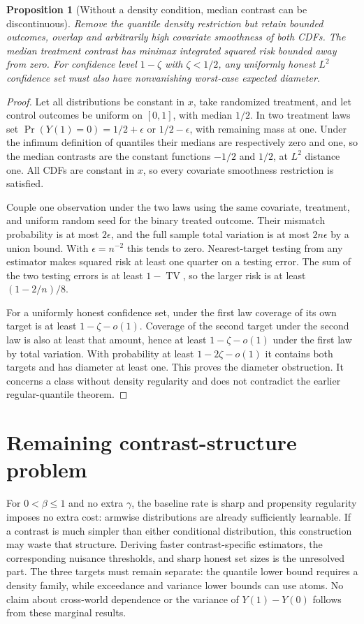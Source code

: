 \documentclass[11pt]{article}
\newtheorem{proposition}[theorem]{Proposition}
\theoremstyle{remark}
\newcommand{\TV}{\operatorname{TV}}
\begin{document}
\begin{proposition}[Without a density condition, median contrast can be discontinuous]\label{failure}
Remove the quantile density restriction but retain bounded outcomes, overlap and arbitrarily high covariate smoothness of both CDFs. The median treatment contrast has minimax integrated squared risk bounded away from zero. For confidence level $1-\zeta$ with $\zeta<1/2$, any uniformly honest $L^2$ confidence set must also have nonvanishing worst-case expected diameter.
\end{proposition}
\begin{proof}
Let all distributions be constant in $x$, take randomized treatment, and let control outcomes be uniform on $[0,1]$, with median $1/2$. In two treatment laws set
$\Pr(Y(1)=0)=1/2+\epsilon$ or $1/2-\epsilon$, with remaining mass at one. Under the infimum definition of quantiles their medians are respectively zero and one, so the median contrasts are the constant functions $-1/2$ and $1/2$, at $L^2$ distance one. All CDFs are constant in $x$, so every covariate smoothness restriction is satisfied.

Couple one observation under the two laws using the same covariate, treatment, and uniform random seed for the binary treated outcome. Their mismatch probability is at most $2\epsilon$, and the full sample total variation is at most $2n\epsilon$ by a union bound. With $\epsilon=n^{-2}$ this tends to zero. Nearest-target testing from any estimator makes squared risk at least one quarter on a testing error. The sum of the two testing errors is at least $1-\TV$, so the larger risk is at least $(1-2/n)/8$.

For a uniformly honest confidence set, under the first law coverage of its own target is at least $1-\zeta-o(1)$. Coverage of the second target under the second law is also at least that amount, hence at least $1-\zeta-o(1)$ under the first law by total variation. With probability at least $1-2\zeta-o(1)$ it contains both targets and has diameter at least one. This proves the diameter obstruction. It concerns a class without density regularity and does not contradict the earlier regular-quantile theorem.
\end{proof}

\section{Remaining contrast-structure problem}
For $0<\beta\leq1$ and no extra $\gamma$, the baseline rate is sharp and propensity regularity imposes no extra cost: armwise distributions are already sufficiently learnable. If a contrast is much simpler than either conditional distribution, this construction may waste that structure. Deriving faster contrast-specific estimators, the corresponding nuisance thresholds, and sharp honest set sizes is the unresolved part. The three targets must remain separate: the quantile lower bound requires a density family, while exceedance and variance lower bounds can use atoms. No claim about cross-world dependence or the variance of $Y(1)-Y(0)$ follows from these marginal results.
\end{document}
